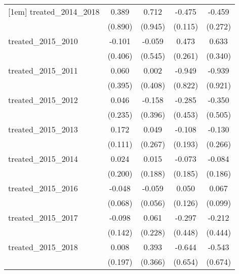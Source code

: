 {\begin{tabular}{l*{4}{c}}
[1em]
treated\_2014\_2018&       0.389         &       0.712         &      -0.475\sym{***}&      -0.459         \\
            &     (0.890)         &     (0.945)         &     (0.115)         &     (0.272)         \\
[1em]
treated\_2015\_2010&      -0.101         &      -0.059         &       0.473         &       0.633         \\
            &     (0.406)         &     (0.545)         &     (0.261)         &     (0.340)         \\
[1em]
treated\_2015\_2011&       0.060         &       0.002         &      -0.949         &      -0.939         \\
            &     (0.395)         &     (0.408)         &     (0.822)         &     (0.921)         \\
[1em]
treated\_2015\_2012&       0.046         &      -0.158         &      -0.285         &      -0.350         \\
            &     (0.235)         &     (0.396)         &     (0.453)         &     (0.505)         \\
[1em]
treated\_2015\_2013&       0.172         &       0.049         &      -0.108         &      -0.130         \\
            &     (0.111)         &     (0.267)         &     (0.193)         &     (0.266)         \\
[1em]
treated\_2015\_2014&       0.024         &       0.015         &      -0.073         &      -0.084         \\
            &     (0.200)         &     (0.188)         &     (0.185)         &     (0.186)         \\
[1em]
treated\_2015\_2016&      -0.048         &      -0.059         &       0.050         &       0.067         \\
            &     (0.068)         &     (0.056)         &     (0.126)         &     (0.099)         \\
[1em]
treated\_2015\_2017&      -0.098         &       0.061         &      -0.297         &      -0.212         \\
            &     (0.142)         &     (0.228)         &     (0.448)         &     (0.444)         \\
[1em]
treated\_2015\_2018&       0.008         &       0.393         &      -0.644         &      -0.543         \\
            &     (0.197)         &     (0.366)         &     (0.654)         &     (0.674)         \\

\end{tabular}}
